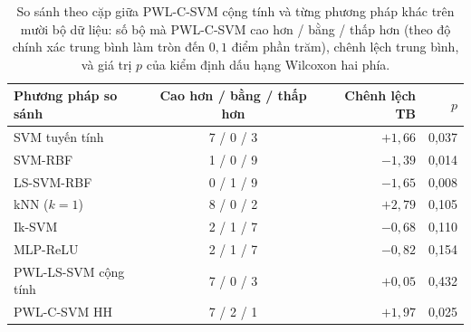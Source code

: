 \begin{table}[t]
\centering
\caption[So sánh theo cặp với PWL-C-SVM cộng tính]{So sánh theo cặp giữa PWL-C-SVM cộng tính và từng phương pháp khác trên mười bộ dữ liệu: số bộ mà PWL-C-SVM cao hơn / bằng / thấp hơn (theo độ chính xác trung bình làm tròn đến $0{,}1$ điểm phần trăm), chênh lệch trung bình, và giá trị $p$ của kiểm định dấu hạng Wilcoxon hai phía.}
\label{tab:wilcoxon}
\small
\renewcommand{\arraystretch}{1.18}
\begin{tabular}{@{}l c r r@{}}
\toprule
\textbf{Phương pháp so sánh} & \textbf{Cao hơn / bằng / thấp hơn} & \textbf{Chênh lệch TB} & $p$\\
\midrule
SVM tuyến tính & 7 / 0 / 3 & $+1{,}66$ & 0{,}037\\
SVM-RBF & 1 / 0 / 9 & $-1{,}39$ & 0{,}014\\
LS-SVM-RBF & 0 / 1 / 9 & $-1{,}65$ & 0{,}008\\
kNN ($k=1$) & 8 / 0 / 2 & $+2{,}79$ & 0{,}105\\
Ik-SVM & 2 / 1 / 7 & $-0{,}68$ & 0{,}110\\
MLP-ReLU & 2 / 1 / 7 & $-0{,}82$ & 0{,}154\\
PWL-LS-SVM cộng tính & 7 / 0 / 3 & $+0{,}05$ & 0{,}432\\
PWL-C-SVM HH & 7 / 2 / 1 & $+1{,}97$ & 0{,}025\\
\bottomrule
\end{tabular}
\end{table}
